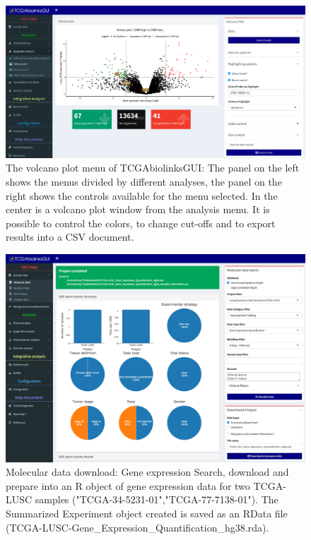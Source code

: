 \begin{figure}
\includegraphics[width=1.0\linewidth]{images/fig1-GUI.pdf}
\caption[TCGAbiolinksGUI: The volcano plot menu]{The volcano plot menu of TCGAbiolinksGUI: The panel on the left shows the menus divided by different analyses, the panel on the right shows the controls available for the menu selected. In the center is a volcano plot window from the  analysis menu. It is possible to control the colors, to change cut-offs and to export results into a CSV document.}
\label{fig:fig1}
\end{figure}

\begin{figure}
\includegraphics[width=1.0\linewidth]{images/fig2-Data_expression.png}
\caption[TCGAbiolinksGUI: Gene expression download: ]{Molecular data download: Gene expression Search, download and prepare into an R object of gene expression data for two TCGA-LUSC samples ("TCGA-34-5231-01","TCGA-77-7138-01"). The Summarized Experiment object created is saved as an RData file (TCGA-LUSC-Gene\_Expression\_Quantification\_hg38.rda). }
\label{fig:geneexp}
\end{figure}

